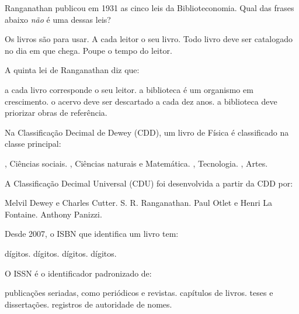 \documentclass[11pt,a4paper,addpoints]{exam}
\begin{document}
\begin{questions}

\question[1] Ranganathan publicou em 1931 as cinco leis da Biblioteconomia. Qual das frases abaixo \emph{não} é uma dessas leis?
\begin{choices}
  \choice Os livros são para usar.
  \choice A cada leitor o seu livro.
  \CorrectChoice Todo livro deve ser catalogado no dia em que chega.
  \choice Poupe o tempo do leitor.
\end{choices}

\question[1] A quinta lei de Ranganathan diz que:
\begin{choices}
  \choice a cada livro corresponde o seu leitor.
  \CorrectChoice a biblioteca é um organismo em crescimento.
  \choice o acervo deve ser descartado a cada dez anos.
  \choice a biblioteca deve priorizar obras de referência.
\end{choices}

\question[1] Na Classificação Decimal de Dewey (CDD), um livro de Física é classificado na classe principal:
\begin{choices}
  , Ciências sociais.
  , Ciências naturais e Matemática.
  , Tecnologia.
  , Artes.
\end{choices}

\question[1] A Classificação Decimal Universal (CDU) foi desenvolvida a partir da CDD por:
\begin{choices}
  \choice Melvil Dewey e Charles Cutter.
  \choice S. R. Ranganathan.
  \CorrectChoice Paul Otlet e Henri La Fontaine.
  \choice Anthony Panizzi.
\end{choices}

\question[1] Desde 2007, o ISBN que identifica um livro tem:
\begin{choices}
   dígitos.
   dígitos.
   dígitos.
   dígitos.
\end{choices}

\question[1] O ISSN é o identificador padronizado de:
\begin{choices}
  \CorrectChoice publicações seriadas, como periódicos e revistas.
  \choice capítulos de livros.
  \choice teses e dissertações.
  \choice registros de autoridade de nomes.
\end{choices}


\end{questions}
\end{document}
